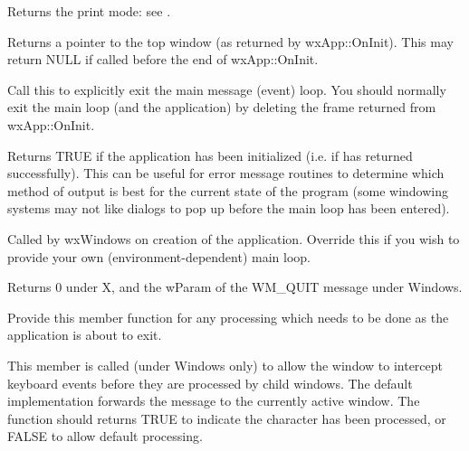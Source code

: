\label{wxappgetprintmode}


Returns the print mode: see .

\label{wxappgettopwindow}


Returns a pointer to the top window (as returned by wxApp::OnInit). This may return NULL
if called before the end of wxApp::OnInit.



Call this to explicitly exit the main message (event) loop.
You should normally exit the main loop (and the application) by deleting
the frame returned from wxApp::OnInit.



Returns TRUE if the application has been initialized (i.e. if\rtfsp
{} has returned successfully).  This can be useful for error
message routines to determine which method of output is best for the
current state of the program (some windowing systems may not like
dialogs to pop up before the main loop has been entered).



Called by wxWindows on creation of the application. Override this if you wish
to provide your own (environment-dependent) main loop.

Returns 0 under X, and the wParam of the WM\_QUIT message under Windows.

\label{apponexit}


Provide this member function for any processing which needs to be done as
the application is about to exit.

\label{wxapponcharhook}


This member is called (under Windows only) to allow the window to intercept keyboard events
before they are processed by child windows. The default implementation
forwards the message to the currently active window.
The function should returns TRUE to indicate the
character has been processed, or FALSE to allow default processing.

